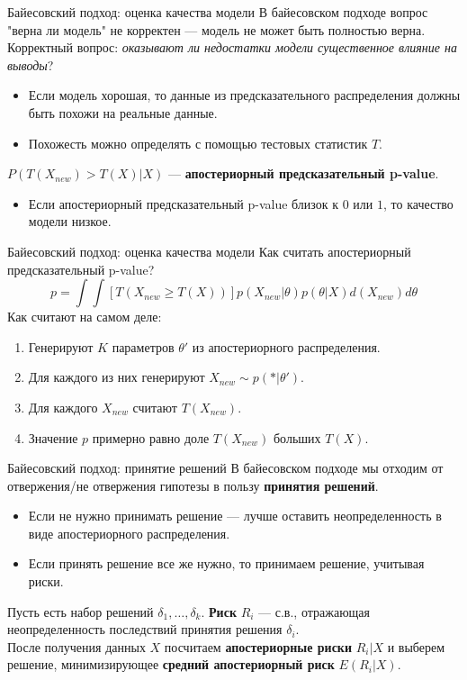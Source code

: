 \documentclass[handout]{beamer}
\begin{document}
\begin{frame}{Байесовский подход: оценка качества модели}
	В байесовском подходе вопрос "верна ли модель" не корректен --- модель не может быть полностью верна.\\
	Корректный вопрос: \textit{оказывают ли недостатки модели существенное влияние на выводы}?
	\begin{itemize}
		\item Если модель хорошая, то данные из предсказательного распределения должны быть похожи на реальные данные.
		\item Похожесть можно определять с помощью тестовых статистик $T$.
	\end{itemize}
	$P(T(X_{new}) > T(X)|X)$ --- \textbf{апостериорный предсказательный p-value}.
	\begin{itemize}
		\item Если апостериорный предсказательный p-value близок к $0$ или $1$, то качество модели низкое.
	\end{itemize}
\end{frame}

\begin{frame}{Байесовский подход: оценка качества модели}
	Как считать апостериорный предсказательный p-value?
	\begin{equation*}
		p=\int \int [T(X_{new}\geq T(X))]p(X_{new}|\theta)p(\theta|X)d(X_{new})d\theta
	\end{equation*}
	Как считают на самом деле:
	\begin{enumerate}
		\item Генерируют $K$ параметров $\theta'$ из апостериорного распределения.
		\item Для каждого из них генерируют $X_{new} \sim p(*|\theta')$.
		\item Для каждого $X_{new}$ считают $T(X_{new})$.
		\item Значение $p$ примерно равно доле $T(X_{new})$ больших $T(X)$.
	\end{enumerate}
\end{frame}

\begin{frame}{Байесовский подход: принятие решений}
	В байесовском подходе мы отходим от отвержения/не отвержения гипотезы в пользу \textbf{принятия решений}.
	\begin{itemize}
		\item Если не нужно принимать решение --- лучше оставить неопределенность в виде апостериорного распределения.
		\item Если принять решение все же нужно, то принимаем решение, учитывая риски.
	\end{itemize}
	Пусть есть набор решений $\delta_1, \dots, \delta_k$. \textbf{Риск} $R_i$ --- с.в., отражающая неопределенность последствий принятия решения $\delta_i$.\\
	После получения данных $X$ посчитаем \textbf{апостериорные риски} $R_i|X$ и выберем решение, минимизирующее \textbf{средний апостериорный риск} $E(R_i|X)$.
\end{frame}
\end{document}

